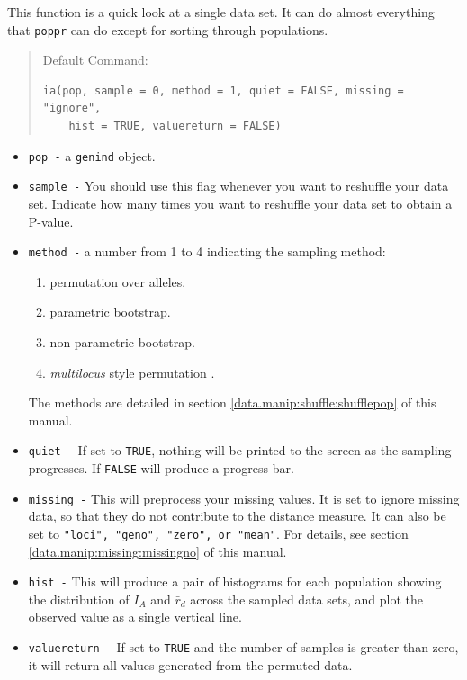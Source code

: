 \documentclass[letterpaper]{article}\usepackage[]{graphicx}\usepackage[]{color}
\makeatletter
\newenvironment{kframe}{%
 \def\at@end@of@kframe{}%
 \ifinner\ifhmode%
  \def\at@end@of@kframe{\end{minipage}}%
  \begin{minipage}{\columnwidth}%
 \fi\fi%
 \def\FrameCommand##1{\hskip\@totalleftmargin \hskip-\fboxsep
 \colorbox{shadecolor}{##1}\hskip-\fboxsep
     \hskip-\linewidth \hskip-\@totalleftmargin \hskip\columnwidth}%
 \MakeFramed {\advance\hsize-\width
   \@totalleftmargin\z@ \linewidth\hsize
   \@setminipage}}%
 {\par\unskip\endMakeFramed%
 \at@end@of@kframe}
\newenvironment{knitrout}{}{} %
\newcommand{\tab}{\hspace*{1em}}
\makeatother
\begin{document}
\tab\tab This function is a quick look at a single data set. It can do almost everything that \texttt{poppr} can do except for sorting through populations.
\begin{quote}
Default Command:
\begin{knitrout}
\color{fgcolor}\begin{kframe}
\begin{verbatim}
ia(pop, sample = 0, method = 1, quiet = FALSE, missing = "ignore", 
    hist = TRUE, valuereturn = FALSE)
\end{verbatim}
\end{kframe}
\end{knitrout}

\end{quote}
\begin{itemize}
  \item \texttt{pop -} a \texttt{genind} object.
  \item \texttt{sample -} You should use this flag whenever you want to reshuffle your data set. Indicate how many times you want to reshuffle your data set to obtain a P-value. 
  \item \texttt{method -} a number from 1 to 4 indicating the sampling method:
  \begin{enumerate}
    \item permutation over alleles.
    \item parametric bootstrap.
    \item non-parametric bootstrap.
    \item \textit{multilocus} style permutation \cite{Agapow:2001}.
  \end{enumerate}
  The methods are detailed in section \ref{data.manip:shuffle:shufflepop} of this manual.
  \item \texttt{quiet -} If set to \texttt{TRUE}, nothing will be printed to the screen as the sampling progresses. If \texttt{FALSE} will produce a progress bar.
  \item \texttt{missing -} This will preprocess your missing values. It is set to ignore missing data, so that they do not contribute to the distance measure. It can also be set to \texttt{"loci", "geno", "zero", or "mean"}. For details, see section \ref{data.manip:missing:missingno} of this manual.
  \item \texttt{hist -} This will produce a pair of histograms for each population showing the distribution of $I_A$ and $\bar r_d$ across the sampled data sets, and plot the observed value as a single vertical line.
  \item \texttt{valuereturn -} If set to \texttt{TRUE} and the number of samples
  is greater than zero, it will return all values generated from the permuted
  data. 
\end{itemize}
\end{document}
